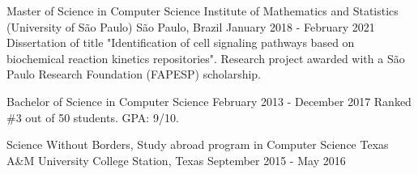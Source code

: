 \documentclass[11pt, a4paper]{awesome-cv-res}
\begin{document}
\begin{cventries}
\cventry
{Master of Science in Computer Science}
{Institute of Mathematics and Statistics (University of São Paulo)} %
{São Paulo, Brazil} %
{January 2018 - February 2021}
{Dissertation of title "Identification of cell signaling pathways 
based on biochemical reaction kinetics repositories". Research project 
awarded with a São Paulo Research Foundation (FAPESP) scholarship.}
\newline

\cventry
{Bachelor of Science in Computer Science} %
{} %
{} %
{February 2013 - December 2017} %
{Ranked \#3 out of 50 students. GPA: 9/10.}
\newline

\cventry
{Science Without Borders, Study abroad program in Computer Science}
{Texas A\&M University}
{College Station, Texas}
{September 2015 - May 2016}
{}
\end{cventries}

\end{document}
